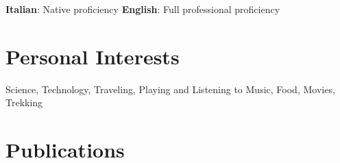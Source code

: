 \documentclass[a4paper,en,print,online]{adcv-template/adcv}
\begin{document}
\ifextended
  \begin{adcvlanguages}
    \adcvlanguagesheader
    \adcvlanguagesfooter
  \end{adcvlanguages}
\else
  \textbf{Italian}: Native proficiency
  \textbf{English}: Full professional proficiency
\fi


\section{Personal Interests}\label{sec:interests}

Science, Technology, Traveling, Playing and Listening to Music, Food, Movies,
Trekking


\ifextended
\vspace{3em}
\else
\ifpublist
\clearpage
\fi
\fi
\section{Publications}\label{sec:publications}

\newcommand{\fullpublicationslist}{
  \begin{refsection}
    \nocite{Ara20CCIS}
    \nocite{Serra21JSA}
    \printbibliography[title={Peer-reviewed Journals\label{sec:journals}}, heading=subbibliography]
  \end{refsection}

  \begin{refsection}
    \nocite{Serra20}
    \nocite{Ara20CLOSER}
    \nocite{Ara19}
    \printbibliography[title={Peer-reviewed Conference and Workshop Proceedings\label{sec:conferences}}, heading=subbibliography]
  \end{refsection}

  \ifextended
    \clearpage
  \fi
  \begin{refsection}
    \nocite{MC2020}
    \nocite{MF2017}
    \nocite{MC2015}
    \nocite{MF2014}
    \printbibliography[title={Book Chapters\label{sec:bookchapters}}, heading=subbibliography]
  \end{refsection}
}
\end{document}

